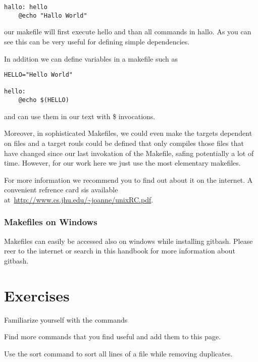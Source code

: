 \begin{lstlisting} 
hallo: hello
    @echo "Hallo World"
\end{lstlisting} 

our makefile will first execute hello and than all commands in hallo.
As you can see this can be very useful for defining simple
dependencies. 

In addition we can define variables in a makefile such as 

\begin{lstlisting} 
HELLO="Hello World"

hello: 
    @echo $(HELLO)
\end{lstlisting} 

and can use them in our text with \$ invocations.

Moreover, in sophisticated Makefiles, we could even make the targets
dependent on files and a target rouls could be defined that only
compiles those files that have changed since our last invokation of
the Makefile, safing potentially a lot of time. However, for our work
here we just use the most elementary makefiles.

For more information we recommend you to find out about it on the internet.
A convenient refrence card sis available at~\url{http://www.cs.jhu.edu/~joanne/unixRC.pdf}.


\subsubsection{Makefiles on Windows}

Makefiles can easily be accessed also on windows while installing
gitbash. Please reer to the internet or search in this handbook for
more information about gitbash.



\section{Exercises}

\begin{exercise}
\label{E:Linux.1}
Familiarize yourself with the commands
\end{exercise}

\begin{exercise}
\label{E:Linux.2}
Find more commands that you find useful and add them to this page.
\end{exercise}

\begin{exercise}
\label{E:Linux.3}
Use the sort command to sort all lines of a file while removing
duplicates.
\end{exercise}

